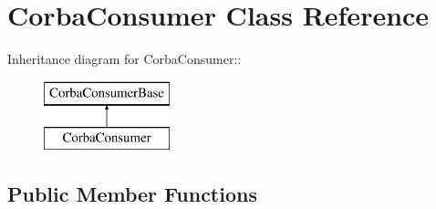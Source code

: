 \section{Corba\-Consumer Class Reference}
\label{classCorbaConsumer}
Inheritance diagram for Corba\-Consumer::\begin{figure}[H]
\begin{center}
\leavevmode
\includegraphics[height=2cm]{classCorbaConsumer}
\end{center}
\end{figure}
\subsection*{Public Member Functions}
